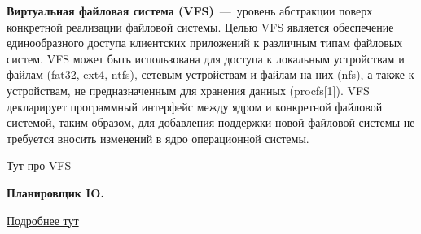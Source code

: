 \documentclass{article}
\begin{document}
\textbf{Виртуальная файловая система (VFS)}~---~уровень абстракции поверх конкретной реализации файловой системы. Целью VFS является обеспечение единообразного доступа клиентских приложений к различным типам файловых систем. VFS может быть использована для доступа к локальным устройствам и файлам (fat32, ext4, ntfs), сетевым устройствам и файлам на них (nfs), а также к устройствам, не предназначенным для хранения данных (procfs[1]). VFS декларирует программный интерфейс между ядром и конкретной файловой системой, таким образом, для добавления поддержки новой файловой системы не требуется вносить изменений в ядро операционной системы.

\href{https://russianblogs.com/article/825789153/}{Тут про VFS}

\textbf{Планировщик IO.}

\href{https://xakep.ru/2014/05/11/input-out-linux-planning/}{Подробнее тут}
\end{document}
